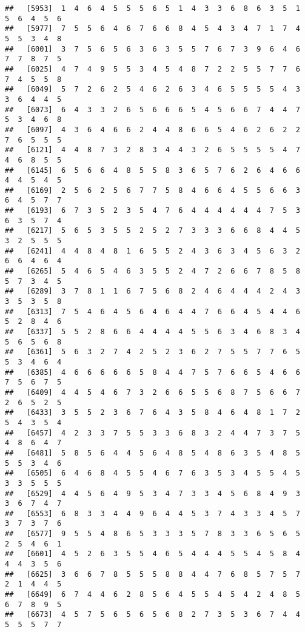 \documentclass[
]{book}
\begin{document}
\begin{verbatim}
##   [5953]  1  4  6  4  5  5  5  6  5  1  4  3  3  6  8  6  3  5  1  5  6  4  5  6
##   [5977]  7  5  5  6  4  6  7  6  6  8  4  5  4  3  4  7  1  7  4  5  5  3  4  8
##   [6001]  3  7  5  6  5  6  3  6  3  5  5  7  6  7  3  9  6  4  6  7  7  8  7  5
##   [6025]  4  7  4  9  5  5  3  4  5  4  8  7  2  2  5  5  7  7  6  7  4  5  5  8
##   [6049]  5  7  2  6  2  5  4  6  2  6  3  4  6  5  5  5  5  4  3  3  6  4  4  5
##   [6073]  6  4  3  3  2  6  5  6  6  6  5  4  5  6  6  7  4  4  7  5  3  4  6  8
##   [6097]  4  3  6  4  6  6  2  4  4  8  6  6  5  4  6  2  6  2  2  7  6  5  5  5
##   [6121]  4  4  8  7  3  2  8  3  4  4  3  2  6  5  5  5  5  4  7  4  6  8  5  5
##   [6145]  6  5  6  6  4  8  5  5  8  3  6  5  7  6  2  6  4  6  6  4  4  5  4  5
##   [6169]  2  5  6  2  5  6  7  7  5  8  4  6  6  4  5  5  6  6  3  6  4  5  7  7
##   [6193]  6  7  3  5  2  3  5  4  7  6  4  4  4  4  4  4  7  5  3  6  3  5  7  4
##   [6217]  5  6  5  3  5  5  2  5  2  7  3  3  3  6  6  8  4  4  5  3  2  5  5  5
##   [6241]  4  4  8  4  8  1  6  5  5  2  4  3  6  3  4  5  6  3  2  6  6  4  6  4
##   [6265]  5  4  6  5  4  6  3  5  5  2  4  7  2  6  6  7  8  5  8  5  7  3  4  5
##   [6289]  3  7  8  1  1  6  7  5  6  8  2  4  6  4  4  4  2  4  3  3  5  3  5  8
##   [6313]  7  5  4  6  4  5  6  4  6  4  4  7  6  6  4  5  4  4  6  5  2  8  4  6
##   [6337]  5  5  2  8  6  6  4  4  4  4  5  5  6  3  4  6  8  3  4  5  6  5  6  8
##   [6361]  5  6  3  2  7  4  2  5  2  3  6  2  7  5  5  7  7  6  5  5  3  4  6  4
##   [6385]  4  6  6  6  6  6  5  8  4  4  7  5  7  6  6  5  4  6  6  7  5  6  7  5
##   [6409]  4  4  5  4  6  7  3  2  6  6  5  5  6  8  7  5  6  6  7  2  6  5  2  5
##   [6433]  3  5  5  2  3  6  7  6  4  3  5  8  4  6  4  8  1  7  2  5  4  3  5  4
##   [6457]  4  2  3  3  7  5  5  3  3  6  8  3  2  4  4  7  3  7  5  4  8  6  4  7
##   [6481]  5  8  5  6  4  4  5  6  4  8  5  4  8  6  3  5  4  8  5  5  5  3  4  6
##   [6505]  6  4  6  8  4  5  5  4  6  7  6  3  5  3  4  5  5  4  5  3  3  5  5  5
##   [6529]  4  4  5  6  4  9  5  3  4  7  3  3  4  5  6  8  4  9  3  3  6  7  4  7
##   [6553]  6  8  3  3  4  4  9  6  4  4  5  3  7  4  3  3  4  5  7  3  7  3  7  6
##   [6577]  9  5  5  4  8  6  5  3  3  3  5  7  8  3  3  6  5  6  5  2  5  4  6  1
##   [6601]  4  5  2  6  3  5  5  4  6  5  4  4  4  5  5  4  5  8  4  4  4  3  5  6
##   [6625]  3  6  6  7  8  5  5  5  8  8  4  4  7  6  8  5  7  5  7  2  1  4  4  5
##   [6649]  6  7  4  4  6  2  8  5  6  4  5  5  4  5  4  2  4  8  5  6  7  8  9  5
##   [6673]  4  5  7  5  6  5  6  5  6  8  2  7  3  5  3  6  7  4  4  5  5  5  7  7

\end{verbatim}
\end{document}
